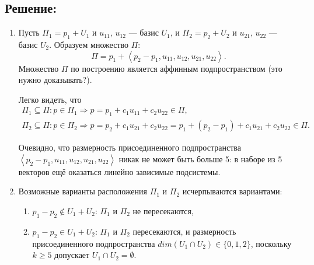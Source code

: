 \documentclass[12pt]{article}
\begin{document}
    \subsection*{Решение:}
    \begin{enumerate}
        \item
        Пусть $\Pi_1 = p_1 + U_1$ и $u_{11}$, $u_{12}$ --- базис $U_1$, и $\Pi_2 = p_2 + U_2$ и $u_{21}$, $u_{22}$ --- базис $U_2$. Образуем множество $\Pi$:
        \[
            \Pi = p_1 + \left < p_2 - p_1, u_{11}, u_{12}, u_{21}, u_{22} \right >.
        \]
        Множество $\Pi$ по построению является аффинным подпространством (это нужно доказывать?).

        Легко видеть, что
        \begin{gather*}
            \Pi_1 \subseteq \Pi :
            p \in \Pi_1
            \Rightarrow
            p = p_1 + c_1 u_{11} + c_2 u_{22} \in \Pi, \\
            \Pi_2 \subseteq \Pi :
            p \in \Pi_2
            \Rightarrow
            p = p_2 + c_1 u_{21} + c_2 u_{22} = p_1 + (p_2 - p_1) + c_1 u_{21} + c_2 u_{22} \in \Pi .
        \end{gather*}

        Очевидно, что размерность присоединенного подпространства $\left < p_2 - p_1, u_{11}, u_{12}, u_{21}, u_{22} \right >$ никак не может быть больше 5: в наборе из 5 векторов ещё
        оказаться линейно зависимые подсистемы.

        \item Возможные варианты расположения $\Pi_1$ и $\Pi_2$ исчерпываются вариантами:
        \begin{enumerate}
            \item $p_1 - p_2 \notin U_1 + U_2$: $\Pi_1$ и $\Pi_2$ не пересекаются,
            \item $p_1 - p_2 \in U_1 + U_2$: $\Pi_1$ и $\Pi_2$ пересекаются, и размерность присоединенного подпространства $dim\left ( U_1 \cap U_2 \right ) \in \{ 0, 1, 2 \}$, поскольку $k \ge 5$
            допускает $U_1 \cap U_2 = \emptyset$.
        \end{enumerate}
    \end{enumerate}
\end{document}
